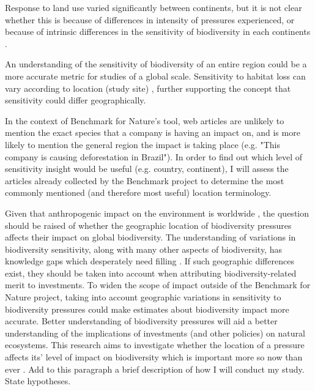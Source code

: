 \documentclass[11pt, a4paper, titlepage]{article}
\begin{document}
   	 Response to land use varied significantly between continents, but it is not clear whether this is because of differences in intensity of pressures experienced, or because of intrinsic differences in the sensitivity of biodiversity in each continents  \citep{phillips2016effects}.
   	 

   	
   	An understanding of the sensitivity of biodiversity of an entire region could be a more accurate metric for studies of a global scale. Sensitivity to habitat loss can vary according to location (study site) \citep{mayor2016assessing}, further supporting the concept that sensitivity could differ geographically. \newline
   	
   	 In the context of Benchmark for Nature's tool, web articles are unlikely to mention the exact species that a company is having an impact on, and is more likely to mention the general region the impact is taking place (e.g. "This company is causing deforestation in Brazil"). In order to find out which level of sensitivity insight would be useful (e.g. country, continent), I will assess the articles already collected by the Benchmark project to determine the most commonly mentioned (and therefore most useful) location terminology.  \newline
   	
   	 Given that anthropogenic impact on the environment is worldwide \citep{plumptre2021might}, the question should be raised of whether the geographic location of biodiversity pressures affects their impact on global biodiversity. The understanding of variations in biodiversity sensitivity, along with many other aspects of biodiversity, has knowledge gaps which desperately need filling \citep{pereira2012global}. If such geographic differences exist, they should be taken into account when attributing biodiversity-related merit to investments. To widen the scope of impact outside of the Benchmark for Nature project, taking into account geographic variations in sensitivity to biodiversity pressures could make estimates about biodiversity impact more accurate. Better understanding of biodiversity pressures will aid a better understanding of the implications of investments (and other policies) on natural ecosystems.  This research aims to investigate whether the location of a pressure affects its' level of impact on biodiversity which is important more so now than ever \citep{ceballos2015accelerated}. Add to this paragraph a brief description of how I will conduct my study. State hypotheses. \newline
\end{document}
